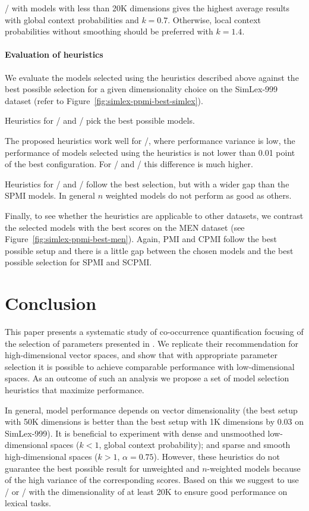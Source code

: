 \documentclass[11pt]{article}
\begin{document}
\logNSCPMI/ with models with less than 20K dimensions gives the highest average results with global context probabilities and $k = 0.7$. Otherwise, local context probabilities without smoothing should be preferred with $k = 1.4$.

\paragraph{Evaluation of heuristics}
\label{sec:heuristic-evaluation}

We evaluate the models selected using the heuristics described above against the best possible selection for a given dimensionality choice on the SimLex-999 dataset (refer to Figure~\ref{fig:simlex-ppmi-best-simlex}).

Heuristics for \logNPMI/ and \logNCPMI/ pick the best possible models.

The proposed heuristics work well for \logNSPMI/, where performance variance is low, the performance of models selected using the heuristics is not lower than 0.01 point of the best configuration. For \SPMI/ and \NSPMI/ this difference is much higher.

Heuristics for \logNCPMI/ and \CPMI/ follow the best selection, but with a wider gap than the SPMI models. In general $n$ weighted models do not perform as good as others.

Finally, to see whether the heuristics are applicable to other datasets, we contrast the selected models with the best scores on the MEN dataset (see Figure~\ref{fig:simlex-ppmi-best-men}). Again, PMI and CPMI follow the best possible setup and there is a little gap between the chosen models and the best possible selection for SPMI and SCPMI.

\section{Conclusion}
\label{sec:conclusion}

This paper presents a systematic study of co-occurrence quantification focusing of the selection of parameters presented in . We replicate their recommendation for high-dimensional vector spaces, and show that with appropriate parameter selection it is possible to achieve comparable performance with low-dimensional spaces. As an outcome of such an analysis we propose a set of model selection heuristics that maximize performance.

In general, model performance depends on vector dimensionality (the best setup with 50K dimensions is better than the best setup with 1K dimensions by 0.03 on SimLex-999). It is beneficial to experiment with dense and unsmoothed low-dimensional spaces ($k < 1$, global context probability); and sparse and smooth high-dimensional spaces ($k > 1$, $\alpha = 0.75$). However, these heuristics do not guarantee the best possible result for unweighted and $n$-weighted models because of the high variance of the corresponding scores. Based on this we suggest to use \logNSPMI/ or \logNSCPMI/ with the dimensionality of at least 20K to ensure good performance on lexical tasks.

%
% 

\balance

\end{document}
